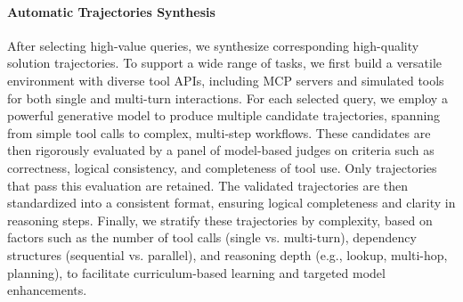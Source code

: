 
\noindent\paragraph{Automatic Trajectories Synthesis}
After selecting high-value queries, we synthesize corresponding high-quality solution trajectories. 
To support a wide range of tasks, we first build a versatile environment with diverse tool APIs, including MCP servers and simulated tools for both single and multi-turn interactions.
For each selected query, we employ a powerful generative model to produce multiple candidate trajectories, spanning from simple tool calls to complex, multi-step workflows. 
These candidates are then rigorously evaluated by a panel of model-based judges on criteria such as correctness, logical consistency, and completeness of tool use.
Only trajectories that pass this evaluation are retained.
The validated trajectories are then standardized into a consistent format, ensuring logical completeness and clarity in reasoning steps.
Finally, we stratify these trajectories by complexity, based on factors such as the number of tool calls (single vs. multi-turn), dependency structures (sequential vs. parallel), and reasoning depth (e.g., lookup, multi-hop, planning), to facilitate curriculum-based learning and targeted model enhancements.

